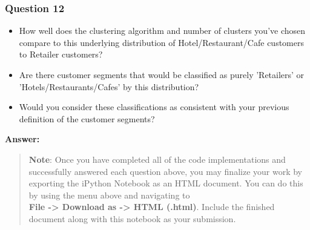 \documentclass[11pt]{article}
\providecommand{\tightlist}{%
      \setlength{\itemsep}{0pt}\setlength{\parskip}{0pt}}
\begin{document}
    \subsubsection{Question 12}\label{question-12}

\begin{itemize}
\tightlist
\item
  How well does the clustering algorithm and number of clusters you've
  chosen compare to this underlying distribution of
  Hotel/Restaurant/Cafe customers to Retailer customers?
\item
  Are there customer segments that would be classified as purely
  'Retailers' or 'Hotels/Restaurants/Cafes' by this distribution?
\item
  Would you consider these classifications as consistent with your
  previous definition of the customer segments?
\end{itemize}

    \textbf{Answer:}

    \begin{quote}
\textbf{Note}: Once you have completed all of the code implementations
and successfully answered each question above, you may finalize your
work by exporting the iPython Notebook as an HTML document. You can do
this by using the menu above and navigating to\\
\textbf{File -\textgreater{} Download as -\textgreater{} HTML (.html)}.
Include the finished document along with this notebook as your
submission.
\end{quote}


    
    
    
    
\end{document}
